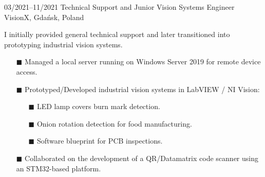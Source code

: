 \documentclass[9pt]{./src/packages/Developer_CV/developercv}
\begin{document}
\begin{entrylist}
{\begin{enumerate}
\begin{enumerate}
        \end{enumerate}
    \end{enumerate}
    }
    \entry
        {03/2021--11/2021}
        {Technical Support and Junior Vision Systems Engineer}
        {VisionX, Gdańsk, Poland}
        {
        I initially provided general technical support and later transitioned into prototyping industrial vision systems.
        \begin{enumerate}
            \item[$\blacksquare$] Managed a local server running on Windows Server 2019 for remote device access.
            \item[$\blacksquare$] Prototyped/Developed industrial vision systems in LabVIEW / NI Vision:
            \begin{enumerate}
                \item[$\blacksquare$] LED lamp covers burn mark detection.
                \item[$\blacksquare$] Onion rotation detection for food manufacturing.
                \item[$\blacksquare$] Software blueprint for PCB inspections.
            \end{enumerate}
            \item[$\blacksquare$] Collaborated on the development of a QR/Datamatrix code scanner using an STM32-based platform.
        \end{enumerate}
        }
    \end{entrylist}
\end{document}
